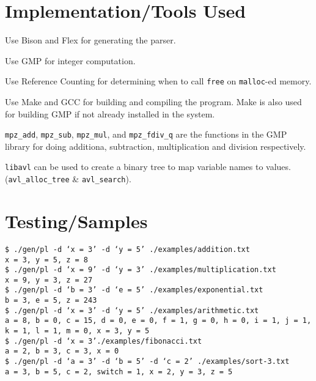 \documentclass[letterpaper,11pt]{article}
\begin{document}
{	\section{Implementation/Tools Used}
	{
		\begin{itemize}
		{
			\item Use Bison and Flex for generating the parser.
			\item Use GMP for integer computation.
			\item Use Reference Counting for determining when to call
				\texttt{free} on \texttt{malloc}-ed memory.
			\item Use Make and GCC for building and compiling the program. Make
				is also used for building GMP if not already installed in
				the system.
			\item \texttt{mpz\_add}, \texttt{mpz\_sub}, \texttt{mpz\_mul}, and
				\texttt{mpz\_fdiv\_q} are the functions in the GMP library for
				doing additiona, subtraction, multiplication and division
				respectively.
			\item \texttt{libavl} can be used to create a binary tree to map
				variable names to values.
				(\texttt{avl\_alloc\_tree} \& \texttt{avl\_search}).
		}
		\end{itemize}
	}
	
	\section{Testing/Samples}
	{
		\texttt{\$ ./gen/pl -d `x = 3' -d `y = 5' ./examples/addition.txt}\\
		\texttt{x = 3, y = 5, z = 8}\\
		\texttt{\$ ./gen/pl -d `x = 9' -d `y = 3' ./examples/multiplication.txt}\\
		\texttt{x = 9, y = 3, z = 27}\\
		\texttt{\$ ./gen/pl -d `b = 3' -d `e = 5' ./examples/exponential.txt}\\
		\texttt{b = 3, e = 5, z = 243}\\
		\texttt{\$ ./gen/pl -d `x = 3' -d `y = 5' ./examples/arithmetic.txt}\\
		\texttt{a = 8, b = 0, c = 15, d = 0, e = 0, f = 1, g = 0, h = 0, i = 1, j = 1, k = 1, l = 1, m = 0, x = 3, y = 5}\\
		\texttt{\$ ./gen/pl -d `x = 3'./examples/fibonacci.txt}\\
		\texttt{a = 2, b = 3, c = 3, x = 0}\\
		\texttt{\$ ./gen/pl -d `a = 3' -d `b = 5' -d `c = 2' ./examples/sort-3.txt}\\
		\texttt{a = 3, b = 5, c = 2, switch = 1, x = 2, y = 3, z = 5}\\
	}
	
}
\end{document}
